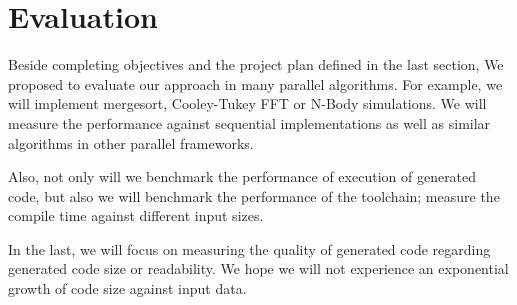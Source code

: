 \chapter{Evaluation}
Beside completing objectives and the project plan defined in the last section, We proposed to evaluate our approach in many parallel algorithms. For example, we will implement mergesort, Cooley-Tukey FFT or N-Body simulations. We will measure the performance against sequential implementations as well as similar algorithms in other parallel frameworks. 

Also, not only will we benchmark the performance of execution of generated code, but also we will benchmark the performance of the toolchain; \eg measure the compile time against different input sizes. 

In the last, we will focus on measuring the quality of generated code regarding generated code size or readability. We hope we will not experience an exponential growth of code size against input data.